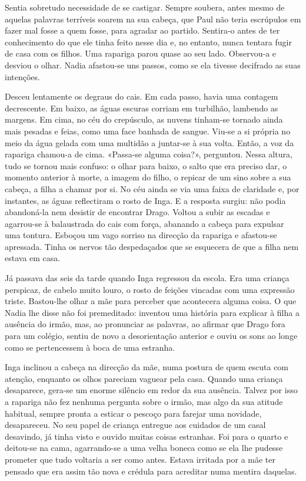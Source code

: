 Sentia sobretudo necessidade de se castigar. Sempre soubera, antes mesmo
de aquelas palavras terríveis soarem na sua cabeça, que Paul não teria
escrúpulos em fazer mal fosse a quem fosse, para agradar ao partido.
Sentira-o antes de ter conhecimento do que ele tinha feito nesse dia e,
no entanto, nunca tentara fugir de casa com os filhos. Uma rapariga
parou quase ao seu lado. Observou-a e desviou o olhar. Nadia afastou-se
uns passos, como se ela tivesse decifrado as suas intenções.

Desceu lentamente os degraus do cais. Em cada passo, havia uma contagem
decrescente. Em baixo, as águas escuras corriam em turbilhão, lambendo
as margens. Em cima, no céu do crepúsculo, as nuvens tinham-se tornado
ainda mais pesadas e feias, como uma face banhada de sangue. Viu-se a si
própria no meio da água gelada com uma multidão a juntar-se à sua
volta. Então, a voz da rapariga chamou-a de cima. «Passa-se alguma
coisa?», perguntou. Nessa altura, tudo se tornou mais confuso: o olhar
para baixo, o salto que era preciso dar, o momento anterior à
morte, a imagem do filho, o repicar de um sino sobre a sua cabeça, a
filha a chamar por si. No céu ainda se via uma faixa de claridade e, por
instantes, as águas reflectiram o rosto de Inga. E a resposta surgiu:
não podia abandoná-la nem desistir de encontrar Drago. Voltou a subir as
escadas e agarrou-se à balaustrada do cais com força, abanando a cabeça
para expulsar uma tontura. Esboçou um vago sorriso na direcção da
rapariga e afastou-se apressada. Tinha os nervos tão despedaçados que se
esquecera de que a filha nem estava em casa.

Já passava das seis da tarde quando Inga regressou da escola. Era uma
criança perspicaz, de cabelo muito louro, o rosto de feições vincadas
com uma expressão triste. Bastou-lhe olhar a mãe para perceber que
acontecera alguma coisa. O que Nadia lhe disse não foi premeditado:
inventou uma história para explicar à filha a ausência do irmão, mas, ao
pronunciar as palavras, ao afirmar que Drago fora para um colégio,
sentiu de novo a desorientação anterior e ouviu os sons ao longe como
se pertencessem à boca de uma estranha.

Inga inclinou a cabeça na direcção da mãe, numa postura de quem escuta
com atenção, enquanto os olhos pareciam vaguear pela casa. Quando uma
criança desaparece, gera-se um enorme silêncio em redor da sua
ausência. Talvez por isso a rapariga não fez nenhuma pergunta sobre o
irmão, mas algo da sua atitude habitual, sempre pronta a esticar o
pescoço para farejar uma novidade, desapareceu. No seu papel de
criança entregue aos cuidados de um casal desavindo, já tinha visto e
ouvido muitas coisas estranhas. Foi para o quarto e deitou-se na cama,
agarrando-se a uma velha boneca como se ela lhe pudesse prometer que tudo
voltaria a ser como antes. Estava irritada por a mãe ter pensado que
era assim tão nova e crédula para acreditar numa mentira daquelas.

